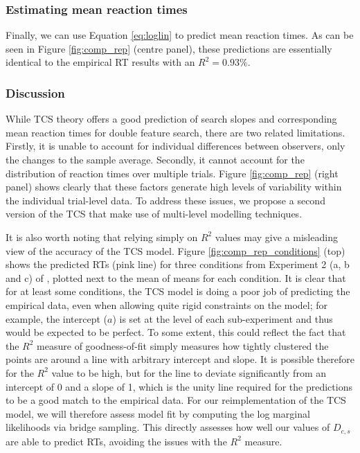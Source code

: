\documentclass[smallextended, natbib]{svjour3}       %
\begin{document}
\subsubsection{Estimating mean reaction times}

Finally, we can use Equation \ref{eq:loglin} to predict mean reaction times. As can be seen in  Figure \ref{fig:comp_rep} (centre panel), these predictions are essentially identical to the empirical RT results with an $R^2 = 0.93\%$.

\subsubsection{Discussion}

While TCS theory offers a good prediction of search slopes and corresponding mean reaction times for double feature search, there are two related limitations. Firstly, it is unable to account for individual differences between observers, only the changes to the sample average. Secondly, it cannot account for the distribution of reaction times over multiple trials. Figure \ref{fig:comp_rep} (right panel) shows clearly that these factors generate high levels of variability within the individual trial-level data. To address these issues, we propose a second version of the TCS that make use of multi-level modelling techniques.

It is also worth noting that relying simply on $R^2$ values may give a misleading view of the accuracy of the TCS model. Figure \ref{fig:comp_rep_conditions} (top) shows the predicted RTs (pink line) for three conditions from Experiment 2 (a, b and c) of \cite{buetti2019predicting}, plotted next to the mean of means for each condition. It is clear that for at least some conditions, the TCS model is doing a poor job of predicting the empirical data, even when allowing quite rigid constraints on the model; for example, the intercept ($a$) is set at the level of each sub-experiment and thus would be expected to be perfect. To some extent, this could reflect the fact that the $R^2$ measure of goodness-of-fit simply measures how tightly clustered the points are around a line with arbitrary intercept and slope. It is possible therefore for the $R^2$ value to be high, but for the line to deviate significantly from an intercept of 0 and a slope of 1, which is the unity line required for the predictions to be a good match to the empirical data. For our reimplementation of the TCS model, we will therefore assess model fit by computing the log marginal likelihoods via bridge sampling. This directly assesses how well our values of $D_{c,s}$ are able to predict RTs, avoiding the issues with the $R^2$ measure.
\end{document}
